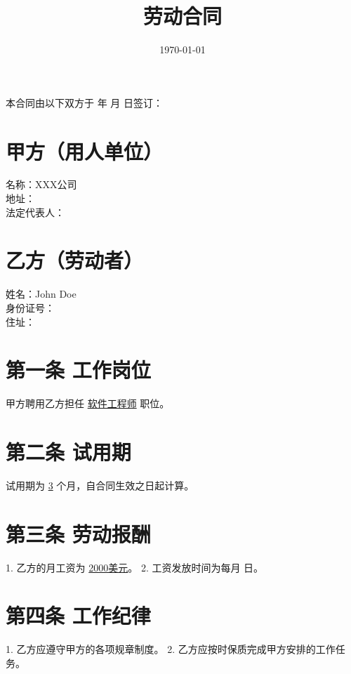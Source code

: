 \documentclass[UTF8]{ctexart}
\title{劳动合同}
\author{}
\date{\today}
\begin{document}
\maketitle

本合同由以下双方于 \underline{\hspace{3cm}} 年 \underline{\hspace{1cm}} 月 \underline{\hspace{1cm}} 日签订：

\section*{甲方（用人单位）}
名称：XXX公司 \\
地址：\underline{\hspace{8cm}} \\
法定代表人：\underline{\hspace{4cm}} \\

\section*{乙方（劳动者）}
姓名：John Doe \\
身份证号：\underline{\hspace{8cm}} \\
住址：\underline{\hspace{8cm}} \\

\section*{第一条 工作岗位}
甲方聘用乙方担任 \underline{软件工程师} 职位。

\section*{第二条 试用期}
试用期为 \underline{3} 个月，自合同生效之日起计算。

\section*{第三条 劳动报酬}
1. 乙方的月工资为 \underline{2000美元}。
2. 工资发放时间为每月 \underline{\hspace{2cm}} 日。

\section*{第四条 工作纪律}
1. 乙方应遵守甲方的各项规章制度。
2. 乙方应按时保质完成甲方安排的工作任务。
\end{document}
